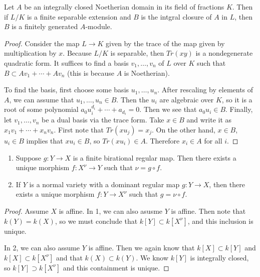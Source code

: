 \documentclass[twoside, 10pt]{article}
\begin{document}
        \begin{lem} Let $A$ be an integrally closed Noetherian domain in its
            field of fractions $K$. Then if $L/K$ is a finite separable
            extension and $B$ is the intgral closure of $A$ in $L$, then $B$ is
            a finitely generated $A$-module.  \begin{proof} Consider the map $L
                \to K$ given by the trace of the map given by multiplication by
                $x$. Because $L/K$ is separable, then $Tr(xy)$ is a
                nondegenerate quadratic form. It suffices to find a basis $v_1,
                \ldots, v_n$ of $L$ over $K$ such that $B \subset A v_1 +
                \cdots + Av_n$ (this is because $A$ is Noetherian).

                To find the basis, first choose some basis $u_1, \ldots, u_n$.
                After rescaling by elements of $A$, we can assume that $u_1,
                \ldots, u_n \in B$. Then the $u_i$ are algebraic over $K$, so
                it is a root of some polynomial $a_0u_i^{d_i} + \cdots +
                a_{d_i} = 0$. Then we see that $a_0u_i \in B$. Finally, let
                $v_1, \ldots, v_n$ be a dual basis via the trace form. Take $x
                \in B$ and write it as $x_1v_1 + \cdots + x_nv_n$. First note
            that $Tr(xu_j) = x_j$. On the other hand, $x \in B$, $u_i \in B$
        implies that $xu_i \in B$, so $Tr(xu_i) \in A$. Therefore $x_i \in A$
    for all $i$.  \end{proof} \end{lem}

        \begin{thm} \begin{enumerate}
            \item Suppose $g:Y \to X$ is a finite birational regular map.  Then
                there exists a unique morphism  $f:X^{\nu} \to Y$ such that
                $\nu = g \circ f$.  \item If $Y$ is a normal variety with a
                dominant regular map $g:Y \to X$, then there exists a unique
        morphism $f:Y \to X^{\nu}$ such that $g = \nu \circ f$.
\end{enumerate} \end{thm}

        \begin{proof} Assume $X$ is affine. In 1, we can also asusme $Y$ is
            affine. Then note that $k(Y) = k(X)$, so we must conclude that
            $k[Y] \subset k[X^{\nu}]$, and this inclusion is unique.

            In 2, we can also assume $Y$ is affine. Then we again know that
            $k[X] \subset k[Y]$ and $k[X]\subset k[X^{\nu}]$ and that $k(X)
            \subset k(Y)$. We know $k[Y]$ is integrally closed, so $k[Y]
            \supset k[X^{\nu}]$ and this containment is unique.  \end{proof}
\end{document}
